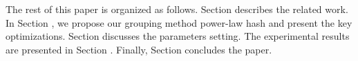 The rest of this paper is organized as follows. Section \uppercase\expandafter{} describes the related work. In Section \uppercase\expandafter{}, we propose our grouping method power-law hash and present the key optimizations. Section \uppercase\expandafter{} discusses the parameters setting. The experimental results are presented in Section \uppercase\expandafter{}. Finally, Section \uppercase\expandafter{} concludes the paper.

